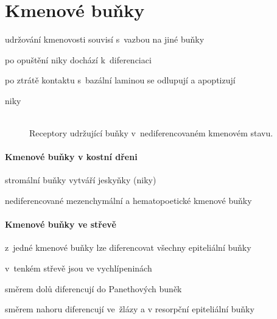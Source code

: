 \documentclass[DIV=8]{scrreprt}
\begin{document}
\section{Kmenové buňky} \label{Kmenové buňky} \FloatBarrier


\begin{myItemize}[nosep]
    \item udržování kmenovosti souvisí s vazbou na jiné buňky
\begin{myItemize}[nosep]
    \item po opuštění niky dochází k diferenciaci
\end{myItemize}

    \item po ztrátě kontaktu s bazální laminou se odlupují a apoptizují
\end{myItemize}



\begin{description}
\item[niky]\hfill \\
Receptory udržující buňky v nediferencovaném kmenovém stavu.

\end{description}


\paragraph{Kmenové buňky v kostní dřeni}
\begin{myItemize}[nosep]
    \item stromální buňky vytváří jeskyňky (niky)
\begin{myItemize}[nosep]
    \item nediferencované mezenchymální a hematopoetické kmenové buňky
\end{myItemize}

\end{myItemize}



\paragraph{Kmenové buňky ve střevě}
\begin{myItemize}[nosep]
    \item z jedné kmenové buňky lze diferencovat všechny epiteliální buňky
    \item v tenkém střevě jsou ve vychlípeninách
\begin{myItemize}[nosep]
    \item směrem dolů diferencují do Panethových buněk
    \item směrem nahoru diferencují ve žlázy a v resorpční epiteliální buňky
\end{myItemize}

\end{myItemize}
\end{document}
